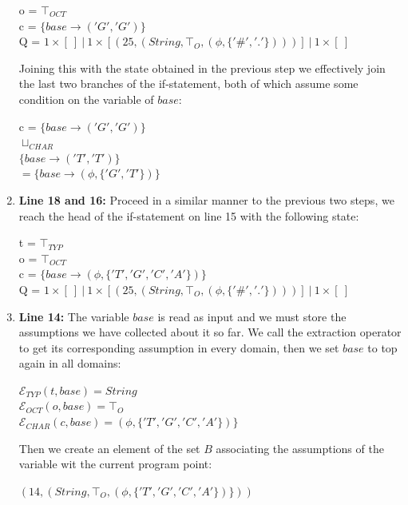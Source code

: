 \documentclass[10pt]{report}
\begin{document}
\begin{enumerate}
\begin{center}
		o = $ \top_{OCT}$ \\
		c =  $ \lbrace base \rightarrow ('G', 'G') \rbrace $\\
		Q = $ 1 \times [\ ]\ \vert\ 1 \times [(25, (String, \top_{O}, (\phi, \lbrace '\#', '.' \rbrace)))]\ \vert\ 1 \times [\ ]$\\
	\end{center}
	Joining this with the state obtained in the previous step we effectively join the last two branches of the if-statement, both of which assume some condition on the variable of $ base $:
	\begin{center}
		c =  $ \lbrace base \rightarrow ('G', 'G') \rbrace $ \\
		$ \sqcup_{CHAR} $ \\
		$ \lbrace base \rightarrow ('T', 'T') \rbrace $ \\
		$ = \lbrace base \rightarrow (\phi,\lbrace 'G', 'T' \rbrace) \rbrace $
	\end{center}
	\item \textbf{Line 18 and 16:} Proceed in a similar manner to the previous two steps, we reach the head of the if-statement on line 15 with the following state: 
	\begin{center}
		t = $ \top_{TYP} $ \\
		o = $ \top_{OCT}$ \\
		c =  $ \lbrace base \rightarrow (\phi, \lbrace'T', 'G', 'C', 'A' \rbrace) \rbrace $\\
		Q = $ 1 \times [\ ]\ \vert\ 1 \times [(25, (String, \top_{O}, (\phi, \lbrace '\#', '.' \rbrace)))]\ \vert\ 1 \times [\ ]$\\
	\end{center}
	\item \textbf{Line 14:} The variable $ base $ is read as input and we must store the assumptions we have collected about it so far. We call the extraction operator to get its corresponding assumption in every domain, then we set $ base $ to top again in all domains: 
	\begin{center}
		$ \mathcal{E}_{TYP} (t, base) = String $ \\
		$ \mathcal{E}_{OCT} (o, base) = \top_{O} $ \\
		$ \mathcal{E}_{CHAR}(c, base) = (\phi, \lbrace'T', 'G', 'C', 'A' \rbrace) \rbrace $
	\end{center}
	Then we create an element of the set $ B $ associating the assumptions of the variable wit the current program point:
	\begin{center}
		$ (14, (String, \top_{O}, (\phi, \lbrace'T', 'G', 'C', 'A' \rbrace) \rbrace)) $

\end{center}
\end{enumerate}
\end{document}
